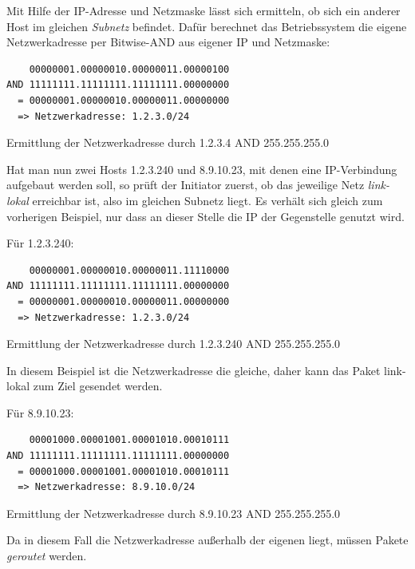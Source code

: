Mit Hilfe der IP-Adresse und Netzmaske lässt sich ermitteln, ob sich ein anderer Host im gleichen \textit{Subnetz} befindet. Dafür berechnet das Betriebssystem die eigene Netzwerkadresse per Bitwise-AND aus eigener IP und Netzmaske:
\begin{listing}[h]
\begin{verbatim}
    00000001.00000010.00000011.00000100
AND 11111111.11111111.11111111.00000000
  = 00000001.00000010.00000011.00000000
  => Netzwerkadresse: 1.2.3.0/24
\end{verbatim}
\label{own-ip-address-AND-subnet}
\caption{Ermittlung der Netzwerkadresse durch 1.2.3.4 AND 255.255.255.0}
\end{listing}
Hat man nun zwei Hosts 1.2.3.240 und 8.9.10.23, mit denen eine IP-Verbindung aufgebaut werden soll, so prüft der Initiator zuerst, ob das jeweilige Netz \textit{link-lokal} erreichbar ist, also im gleichen Subnetz liegt. Es verhält sich gleich zum vorherigen Beispiel, nur dass an dieser Stelle die IP der Gegenstelle genutzt wird.

Für 1.2.3.240:

\begin{listing}[h]
\begin{verbatim}
    00000001.00000010.00000011.11110000
AND 11111111.11111111.11111111.00000000
  = 00000001.00000010.00000011.00000000
  => Netzwerkadresse: 1.2.3.0/24
\end{verbatim}
\label{local-ip-address-AND-subnet}
\caption{Ermittlung der Netzwerkadresse durch 1.2.3.240 AND 255.255.255.0}
\end{listing}
In diesem Beispiel ist die Netzwerkadresse die gleiche, daher kann das Paket link-lokal zum Ziel gesendet werden.

Für 8.9.10.23\label{ip_ausserhalb}:
\begin{listing}[h]
\begin{verbatim}
    00001000.00001001.00001010.00010111
AND 11111111.11111111.11111111.00000000
  = 00001000.00001001.00001010.00010111
  => Netzwerkadresse: 8.9.10.0/24
\end{verbatim}
\label{remote-ip-address-AND-subnet}
\caption{Ermittlung der Netzwerkadresse durch 8.9.10.23 AND 255.255.255.0}
\end{listing}
Da in diesem Fall die Netzwerkadresse außerhalb der eigenen liegt, müssen Pakete \textit{geroutet} werden.

